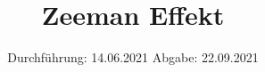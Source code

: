

\subject{V 27}
\title{Zeeman Effekt}
\date{%
  Durchführung: 14.06.2021
  \hspace{3em}
  Abgabe: 22.09.2021
}



\maketitle
\thispagestyle{empty}
\tableofcontents
\newpage







\printbibliography{}


